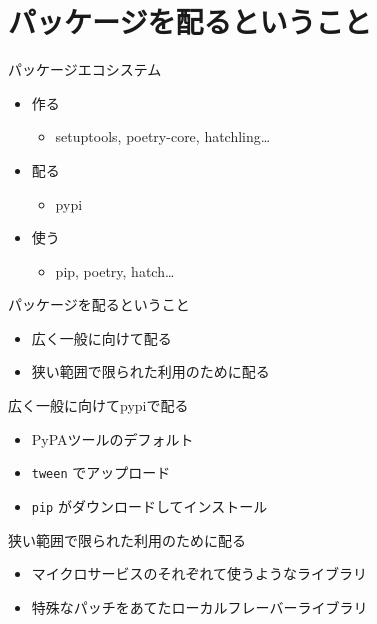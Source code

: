 \documentclass[presentation]{beamer}
\begin{document}
\section{パッケージを配るということ}
\label{sec:org0b51bb1}
\begin{frame}[label={sec:orga405f98}]{パッケージエコシステム}
\begin{itemize}
\item 作る
\begin{itemize}
\item setuptools, poetry-core, hatchling\ldots{}
\end{itemize}
\item 配る
\begin{itemize}
\item pypi
\end{itemize}
\item 使う
\begin{itemize}
\item pip, poetry, hatch\ldots{}
\end{itemize}
\end{itemize}
\end{frame}

\begin{frame}[label={sec:orgcb2999f}]{パッケージを配るということ}
\begin{itemize}
\item 広く一般に向けて配る
\item 狭い範囲で限られた利用のために配る
\end{itemize}
\end{frame}

\begin{frame}[label={sec:orgf45f7e7},fragile]{広く一般に向けてpypiで配る}
 \begin{itemize}
\item PyPAツールのデフォルト
\item \texttt{tween} でアップロード
\item \texttt{pip} がダウンロードしてインストール
\end{itemize}
\end{frame}

\begin{frame}[label={sec:orgd4df995}]{狭い範囲で限られた利用のために配る}
\begin{itemize}
\item マイクロサービスのそれぞれて使うようなライブラリ
\item 特殊なパッチをあてたローカルフレーバーライブラリ
\end{itemize}
\end{frame}
\end{document}
